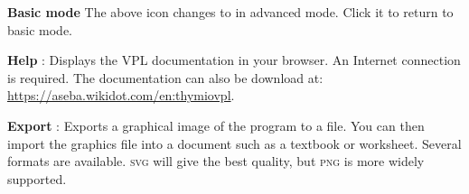 \textbf{Basic mode} The above icon changes to  in advanced mode.
Click it to return to basic mode.

\newpage

\textbf{Help} : Displays the VPL documentation in your
browser. An Internet connection is required. The documentation can also
be download at: \url{https://aseba.wikidot.com/en:thymiovpl}.

\bigskip

\textbf{Export} : \label{p.export} Exports a graphical
image of the program to a file. You can then import the graphics file
into a document such as a textbook or worksheet. Several formats are
available. \textsc{svg} will give the best quality, but \textsc{png} is
more widely supported.



